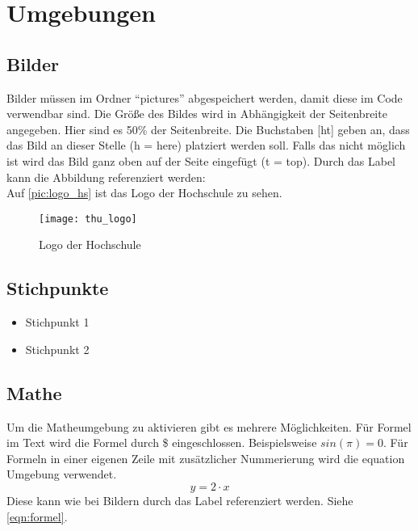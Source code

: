 \section{Umgebungen}

\subsection{Bilder}
Bilder müssen im Ordner "`pictures"' abgespeichert werden, damit diese im Code verwendbar sind.
Die Größe des Bildes wird in Abhängigkeit der Seitenbreite angegeben. Hier sind es 50\% der Seitenbreite. Die Buchstaben [ht] geben an, dass das Bild an dieser Stelle (h = here) platziert werden soll. Falls das nicht möglich ist wird das Bild ganz oben auf der Seite eingefügt (t = top). Durch das Label kann die Abbildung referenziert werden:\\
Auf \autoref{pic:logo_hs} ist das Logo der Hochschule zu sehen.
\begin{figure}[ht]
	\centering
	\texttt{[image: thu\_logo]}
	\caption{Logo der Hochschule}
	\label{pic:logo_hs}
\end{figure}

\subsection{Stichpunkte}
\begin{itemize}
	\item Stichpunkt 1
	\item Stichpunkt 2
\end{itemize}

\subsection{Mathe}
Um die Matheumgebung zu aktivieren gibt es mehrere Möglichkeiten. Für Formel im Text wird die Formel durch \$ eingeschlossen. Beispielsweise $sin(\pi) = 0$. Für Formeln in einer eigenen Zeile mit zusätzlicher Nummerierung wird die equation Umgebung verwendet.
\begin{equation}
	y = 2 \cdot x
	\label{eqn:formel}
\end{equation}
Diese kann wie bei Bildern durch das Label referenziert werden. Siehe \autoref{eqn:formel}.

